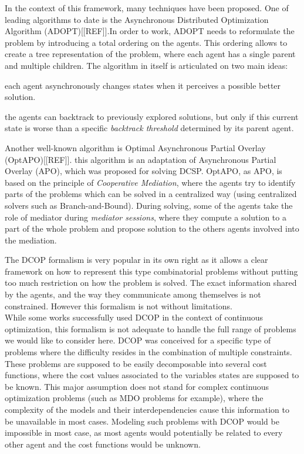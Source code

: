 In the context of this framework, many techniques have been proposed. One of leading algorithms to date is the Asynchronous Distributed Optimization Algorithm (ADOPT)[[REF]].In order to work, ADOPT needs to reformulate the problem by introducing a total ordering on the agents. This ordering allows to create a tree representation of the problem, where each agent has a single parent and multiple children. The algorithm in itself is articulated on two main ideas:

\begin{compactitem}
\item each agent asynchronously changes states when it perceives a possible better solution.
\item the agents can backtrack to previously explored solutions, but only if this current state is worse than a specific \emph{backtrack threshold} determined by its parent agent.
\end{compactitem}

Another well-known algorithm is Optimal Asynchronous Partial Overlay (OptAPO)[[REF]]. this algorithm is an adaptation of Asynchronous Partial Overlay (APO), which was proposed for solving DCSP. OptAPO, as APO, is based on the principle of \emph{Cooperative Mediation}, where the agents try to identify parts of the problems which can be solved in a centralized way (using centralized solvers such as Branch-and-Bound). During solving, some of the agents take the role of mediator during \emph{mediator sessions}, where they compute a solution to a part of the whole problem and propose solution to the others agents involved into the mediation.

The DCOP formalism is very popular in its own right as it allows a clear framework on how to represent this type combinatorial problems without putting too much restriction on how the problem  is solved. The exact information shared by the agents, and the way they communicate among themselves is not constrained. However this formalism is not without limitations.\\
While some works successfully used DCOP in the context of continuous optimization\cite{stranders2009decentralised}, this formalism is not adequate to handle the full range of problems we would like to consider here. DCOP was conceived for a specific type of problems where the difficulty resides in the combination of multiple constraints. These problems are supposed to be easily decomposable into several cost functions, where the cost values associated to the variables states are supposed to be known. This major assumption does not stand for complex continuous optimization problems (such as MDO problems for example), where the complexity of the models and their interdependencies cause this information to be unavailable in most cases. Modeling such problems with DCOP would be impossible in most case, as most agents would potentially be related to every other agent and the cost functions would be unknown.

